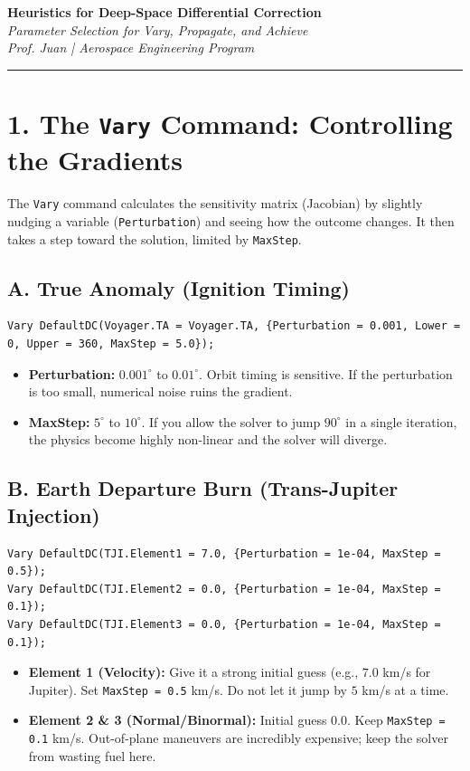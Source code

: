 \documentclass[11pt, letterpaper]{article}
\begin{document}
\begin{center}
    {\Large \textbf{Heuristics for Deep-Space Differential Correction}} \\
    \vspace{0.2cm}
    {\large \textit{Parameter Selection for Vary, Propagate, and Achieve}} \\
    \vspace{0.4cm}
    \textit{Prof. Juan | Aerospace Engineering Program}
\end{center}
\hrule
\vspace{0.5cm}

\section*{1. The \texttt{Vary} Command: Controlling the Gradients}
The \texttt{Vary} command calculates the sensitivity matrix (Jacobian) by slightly nudging a variable (\texttt{Perturbation}) and seeing how the outcome changes. It then takes a step toward the solution, limited by \texttt{MaxStep}.

\subsection*{A. True Anomaly (Ignition Timing)}
\begin{lstlisting}
Vary DefaultDC(Voyager.TA = Voyager.TA, {Perturbation = 0.001, Lower = 0, Upper = 360, MaxStep = 5.0});
\end{lstlisting}
\begin{itemize}
    \item \textbf{Perturbation:} $0.001^\circ$ to $0.01^\circ$. Orbit timing is sensitive. If the perturbation is too small, numerical noise ruins the gradient.
    \item \textbf{MaxStep:} $5^\circ$ to $10^\circ$. If you allow the solver to jump $90^\circ$ in a single iteration, the physics become highly non-linear and the solver will diverge. 
\end{itemize}

\subsection*{B. Earth Departure Burn (Trans-Jupiter Injection)}
\begin{lstlisting}
Vary DefaultDC(TJI.Element1 = 7.0, {Perturbation = 1e-04, MaxStep = 0.5});
Vary DefaultDC(TJI.Element2 = 0.0, {Perturbation = 1e-04, MaxStep = 0.1});
Vary DefaultDC(TJI.Element3 = 0.0, {Perturbation = 1e-04, MaxStep = 0.1});
\end{lstlisting}
\begin{itemize}
    \item \textbf{Element 1 (Velocity):} Give it a strong initial guess (e.g., $7.0$ km/s for Jupiter). Set \texttt{MaxStep = 0.5} km/s. Do not let it jump by $5$ km/s at a time.
    \item \textbf{Element 2 \& 3 (Normal/Binormal):} Initial guess $0.0$. Keep \texttt{MaxStep = 0.1} km/s. Out-of-plane maneuvers are incredibly expensive; keep the solver from wasting fuel here.
\end{itemize}
\end{document}
